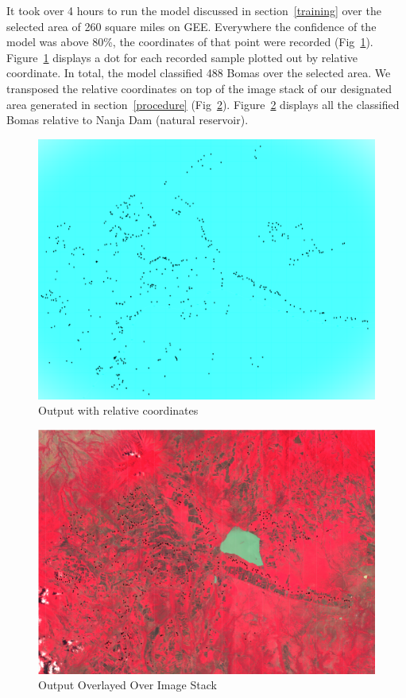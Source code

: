 \documentclass[10pt]{article}
\begin{document}
It took over 4 hours to run the model discussed in section~\ref{training} over the selected area of 260 square miles on GEE. Everywhere the confidence of the model was above 80\%, the coordinates of that point were recorded (Fig~\ref{fig:OutputOnSample}). Figure~\ref{fig:OutputOnSample} displays a dot for each recorded sample plotted out by relative coordinate. In total, the model classified 488 Bomas over the selected area. We transposed the relative coordinates on top of the image stack of our designated area generated in section~\ref{procedure} (Fig~\ref{fig:OverlayedMap}). Figure~\ref{fig:OverlayedMap} displays all the classified Bomas relative to Nanja Dam (natural reservoir).

\begin{figure} [H]
    \centering
    \includegraphics[width=1\linewidth]{images/cv_output.png}
    \caption{Output with relative coordinates}
    \label{fig:OutputOnSample}
\end{figure}

\begin{figure} [H]
    \centering
    \includegraphics[width=1\linewidth]{images/Outputoverlayrealmap.png}
    \caption{Output Overlayed Over Image Stack}
    \label{fig:OverlayedMap}
\end{figure}
\end{document}
